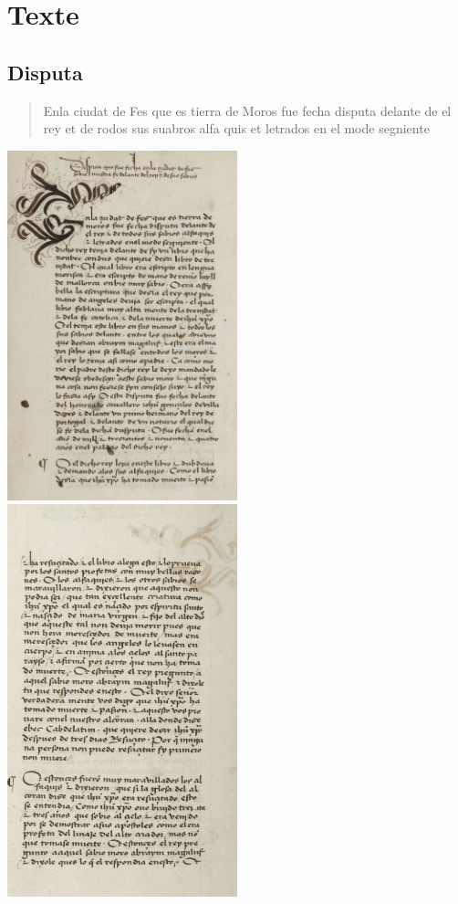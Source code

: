\section{Texte}

\subsection{Disputa }

\begin{quote}
    Enla ciudat de Fes que es tierra de Moros fue fecha disputa delante de el rey et de rodos sus suabros alfa quis et letrados en el mode segniente  
\end{quote}
\includegraphics[width=0.5\textwidth]{HistoireIslamMediterranee/Images/DisputaFez1.png}
\includegraphics[width=0.5\textwidth]{HistoireIslamMediterranee/Images/DisputaFez2.png}

